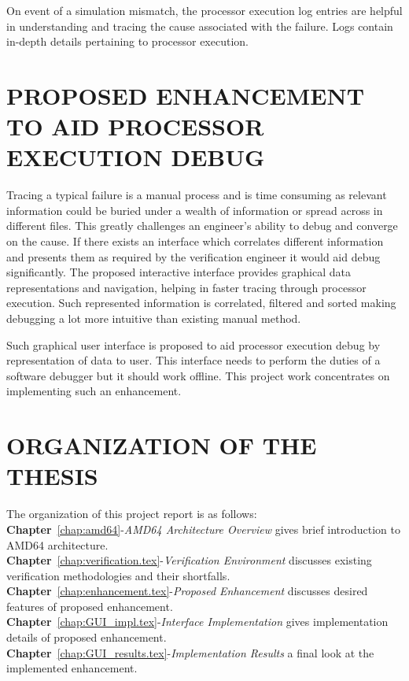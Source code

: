 On event of a simulation mismatch, the processor execution log entries are helpful in understanding and tracing the cause associated with the failure. Logs contain in-depth details pertaining to processor execution. 

\section{PROPOSED ENHANCEMENT TO AID PROCESSOR EXECUTION DEBUG}
Tracing a typical failure is a manual process and is time consuming as relevant information could be buried under a wealth of information or spread across in different files. This greatly challenges an engineer's ability to debug and converge on the cause. If there exists an interface which correlates different information and presents them as required by the verification engineer it would aid debug significantly. The proposed interactive interface provides graphical data representations and navigation, helping in faster tracing through processor execution. Such represented information is correlated, filtered and sorted making debugging a lot more intuitive than existing manual method.


Such graphical user interface is proposed to aid processor execution debug by representation of data to user. This interface needs to perform the duties of a software debugger but it should work offline. This project work concentrates on implementing such an enhancement.

 


\section{ORGANIZATION OF THE THESIS}
The organization of this project report is as follows:\\
\noindent 
{\bf Chapter}~\ref{chap:amd64}-{\it AMD64 Architecture Overview} gives brief introduction to AMD64 architecture.\\
{\bf Chapter}~\ref{chap:verification.tex}-{\it Verification Environment} discusses existing verification methodologies and their shortfalls.\\
{\bf Chapter}~\ref{chap:enhancement.tex}-{\it Proposed Enhancement} discusses desired features of proposed enhancement.\\
{\bf Chapter}~\ref{chap:GUI_impl.tex}-{\it Interface Implementation} gives implementation details of proposed enhancement.\\
{\bf Chapter}~\ref{chap:GUI_results.tex}-{\it Implementation Results} a final look at the implemented enhancement.\\

